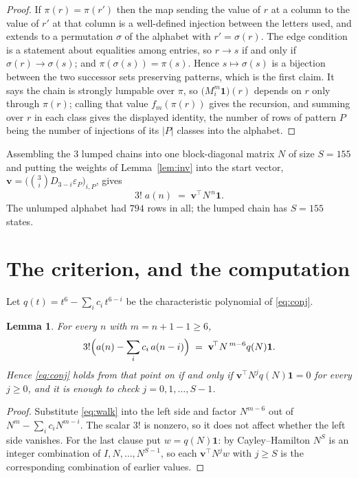 \documentclass[11pt,a4paper]{article}
\theoremstyle{plain}
\newtheorem{lemma}[theorem]{Lemma}
\theoremstyle{definition}
\begin{document}
\begin{proof}
If $\pi(r)=\pi(r')$ then the map sending the value of $r$ at a column to the value of $r'$
at that column is a well-defined injection between the letters used, and extends to a
permutation $\sigma$ of the alphabet with $r'=\sigma(r)$. The edge condition is a statement
about equalities among entries, so $r\to s$ if and only if $\sigma(r)\to\sigma(s)$; and
$\pi(\sigma(s))=\pi(s)$. Hence $s\mapsto\sigma(s)$ is a bijection between the two successor
sets preserving patterns, which is the first claim. It says the chain is strongly lumpable
over $\pi$, so $\bigl(M_i^{m}\mathbf{1}\bigr)(r)$ depends on $r$ only through $\pi(r)$;
calling that value $f_m(\pi(r))$ gives the recursion, and summing over $r$ in each class
gives the displayed identity, the number of rows of pattern $P$ being the number of
injections of its $|P|$ classes into the alphabet.
\end{proof}

Assembling the $3$ lumped chains into one block-diagonal matrix $N$ of size $S=155$ and
putting the weights of Lemma~\ref{lem:inv} into the start vector,
$\mathbf{v}=\bigl(\binom{3}{i}D_{3-i}\varepsilon_P\bigr)_{i,P}$, gives
\begin{equation}\label{eq:walk}
3!\;a(n)\;=\;\mathbf{v}^{\!\top}N^{\,n}\mathbf{1} .
\end{equation}
The unlumped alphabet had $794$ rows in all; the lumped chain has $S=155$ states.

\section{The criterion, and the computation}

Let $q(t)=t^{6}-\sum_i c_i\,t^{6-i}$ be the characteristic polynomial of
\eqref{eq:conj}.

\begin{lemma}\label{lem:crit}
For every $n$ with $m=n+1-1\ge6$,
\[
3!\Bigl(a(n)-\sum_i c_i\,a(n-i)\Bigr)\;=\;\mathbf{v}^{\!\top}N^{\,m-6}q(N)\mathbf{1} .
\]
Hence \eqref{eq:conj} holds from that point on if and only if
$\mathbf{v}^{\!\top}N^{j}q(N)\mathbf{1}=0$ for every $j\ge0$, and it is enough to check
$j=0,1,\dots,S-1$.
\end{lemma}

\begin{proof}
Substitute \eqref{eq:walk} into the left side and factor $N^{m-6}$ out of
$N^{m}-\sum_i c_iN^{m-i}$. The scalar $3!$ is nonzero, so it does not affect whether
the left side vanishes. For the last clause put $w=q(N)\mathbf{1}$: by Cayley--Hamilton
$N^{S}$ is an integer combination of $I,N,\dots,N^{S-1}$, so each
$\mathbf{v}^{\!\top}N^{j}w$ with $j\ge S$ is the corresponding combination of earlier
values.
\end{proof}
\end{document}
